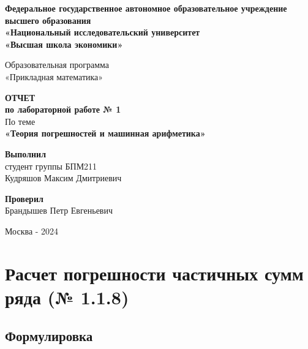 \documentclass[a4paper,11pt]{article}
\theoremstyle{definition} %
\theoremstyle{remark} %
\begin{document}
\begin{titlepage} %
\pagestyle{empty}
\begin{center}

\Large
\textbf{Федеральное государственное автономное образовательное учреждение высшего образования\\
«Национальный исследовательский университет\\
«Высшая школа экономики»}\\
\vspace{5mm}

\Large
Образовательная программа \\
«Прикладная математика»
\vspace{40mm}

\Large
\textbf{ОТЧЕТ} \\
\textbf{по лабораторной работе № 1} \\
\vspace{5mm}
\Large
По теме \\
\LARGE\textbf{«Теория погрешностей и машинная арифметика»}
\end{center}

\begin{center}
\vfill

\large
\begin{flushright}
\textbf{Выполнил} \\
студент группы БПМ211 \\
Кудряшов Максим Дмитриевич \\
\end{flushright}

\large
\begin{flushright}
\textbf{Проверил} \\
Брандышев Петр Евгеньевич \\
\end{flushright}

\large
\vspace{20mm}
Москва - 2024
\end{center}
\end{titlepage} %

\newpage
\tableofcontents
\newpage

\section{Расчет погрешности частичных сумм ряда (№ 1.1.8)}

\subsection{Формулировка}
\end{document}
